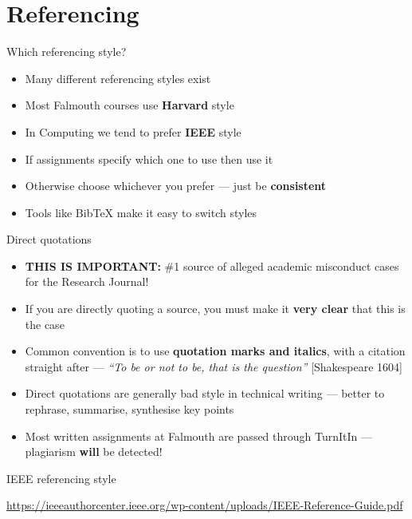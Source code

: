 \part{Referencing}
\frame{\partpage}

\begin{frame}{Which referencing style?}
	\begin{itemize}
		\pause\item Many different referencing styles exist
		\pause\item Most Falmouth courses use \textbf{Harvard} style
		\pause\item In Computing we tend to prefer \textbf{IEEE} style
		\pause\item If assignments specify which one to use then use it
		\pause\item Otherwise choose whichever you prefer --- just be \textbf{consistent}
		\pause\item Tools like BibTeX make it easy to switch styles
	\end{itemize}
\end{frame}

\begin{frame}{Direct quotations}
	\begin{itemize}
		\pause\item \textbf{THIS IS IMPORTANT:} \#1 source of alleged academic misconduct cases for the Research Journal!
		\pause\item If you are directly quoting a source, you must make it \textbf{very clear} that this is the case
		\pause\item Common convention is to use \textbf{quotation marks and italics}, with a citation straight after ---
			\textit{``To be or not to be, that is the question''} [Shakespeare 1604]
		\pause\item Direct quotations are generally bad style in technical writing --- better to rephrase, summarise, synthesise key points
		\pause\item Most written assignments at Falmouth are passed through TurnItIn --- plagiarism \textbf{will} be detected!
	\end{itemize}
\end{frame}

\begin{frame}{IEEE referencing style}
	\begin{center}
		\small\url{https://ieeeauthorcenter.ieee.org/wp-content/uploads/IEEE-Reference-Guide.pdf}
	\end{center}
\end{frame}

